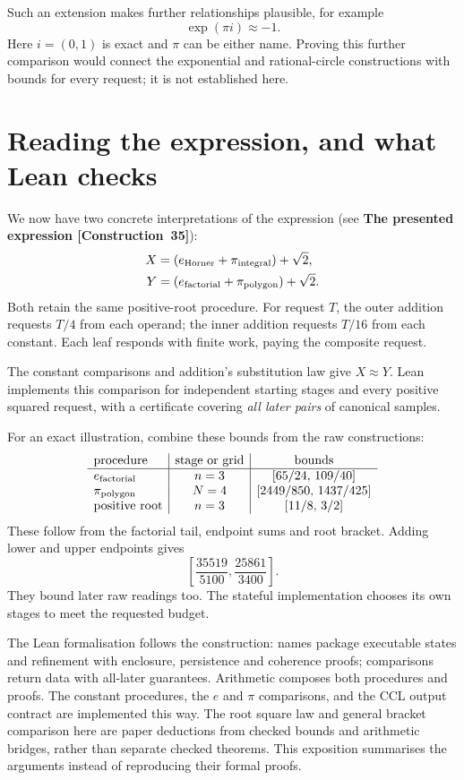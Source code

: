 \documentclass[11pt]{article}
\newcommand{\entryname}[3]{\textbf{#3 \mbox{[#1~#2]}}}
\begin{document}
Such an extension makes further relationships plausible, for example
\[
                             \exp(\pi i)\approx-1.
\]
Here $i=(0,1)$ is exact and $\pi$ can be either name. Proving this further
comparison would connect the exponential and rational-circle constructions
with bounds for every request; it is not established here.

\section{Reading the expression, and what Lean checks}\label{sec:lean}

We now have two concrete interpretations of the expression
(see \entryname{Construction}{35}{The presented expression}):
\begin{align*}
 X&=(e_{\rm Horner}+\pi_{\rm integral})+\sqrt2,\\
 Y&=(e_{\rm factorial}+\pi_{\rm polygon})+\sqrt2.
\end{align*}
Both retain the same positive-root procedure. For request $T$, the outer
addition requests $T/4$ from each operand; the inner addition requests
$T/16$ from each constant. Each leaf responds with finite work, paying
the composite request.

The constant comparisons and addition's substitution law give $X\approx Y$.
Lean implements this comparison for independent starting stages and every
positive squared request, with a certificate covering \emph{all later pairs}
of canonical samples.

For an exact illustration, combine these bounds from the raw constructions:
\begingroup
\renewcommand{\arraystretch}{1.6}
\[
\begin{array}{l|c|c}
\text{procedure}&\text{stage or grid}&\text{bounds}\\ \hline
e_{\rm factorial}&n=3&[65/24,\,109/40]\\
\pi_{\rm polygon}&N=4&[2449/850,\,1437/425]\\
\text{positive root}&n=3&[11/8,\,3/2]
\end{array}
\]
\endgroup
These follow from the factorial tail, endpoint sums and root bracket.
Adding lower and upper endpoints gives
\[
                       \left[\frac{35519}{5100},
                                    \frac{25861}{3400}\right].
\]
They bound later raw readings too. The stateful implementation chooses
its own stages to meet the requested budget.

The Lean formalisation follows the construction: names package executable
states and refinement with enclosure, persistence and coherence proofs;
comparisons return data with all-later guarantees. Arithmetic composes both
procedures and proofs. The constant procedures, the $e$ and $\pi$ comparisons,
and the CCL output contract are implemented this way. The root square law
and general bracket comparison here are paper deductions from checked
bounds and arithmetic bridges, rather than separate checked theorems.
This exposition summarises the arguments instead of reproducing their
formal proofs.
\end{document}
